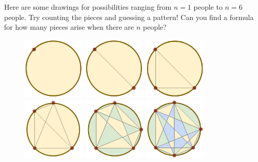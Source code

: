 \documentclass{article}
\begin{document}
            Here are some drawings for possibilities ranging from $n=1$ people
            to $n=6$ people.  Try counting the pieces and guessing a pattern!
            Can you find a formula for how many pieces arise when there are $n$
            people?
            \begin{figure}[h!]
                \centering
                \includegraphics[height=3cm]{cake-1}
                \includegraphics[height=3cm]{cake-2}
                \includegraphics[height=3cm]{cake-3} \\
                \includegraphics[height=3cm]{cake-4}
                \includegraphics[height=3cm]{cake-5-col}
                \includegraphics[height=3cm]{cake-6-col}

\end{figure}
\end{document}
